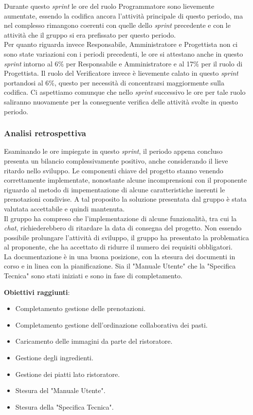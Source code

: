 Durante questo \textit{sprint} le ore del ruolo Programmatore sono lievemente aumentate, essendo la codifica ancora l'attività principale di questo periodo, ma nel complesso rimangono coerenti con quelle dello \textit{sprint} precedente e con le attività che il gruppo si era prefissato per questo periodo.\\
Per quanto riguarda invece Responsabile, Amministratore e Progettista non ci sono state variazioni con i periodi precedenti, le ore si attestano anche in questo \textit{sprint} intorno al 6\% per Responsabile e Amministratore e al 17\% per il ruolo di Progettista.
Il ruolo del Verificatore invece è lievemente calato in questo \textit{sprint} portandosi al 6\%, questo per necessità di concentrarsi maggiormente sulla codifica. Ci aspettiamo comunque che nello \textit{sprint} successivo le ore per tale ruolo saliranno nuovamente per la conseguente verifica delle attività svolte in questo periodo.


\subsubsection{Analisi retrospettiva}
Esaminando le ore impiegate in questo \textit{sprint}, il periodo appena concluso presenta un bilancio complessivamente positivo, anche considerando il lieve ritardo nello sviluppo.
Le componenti chiave del progetto stanno venendo correttamente implementate, nonostante alcune incomprensioni con il proponente riguardo al metodo di impementazione di alcune caratteristiche inerenti le prenotazioni condivise.
A tal proposito la soluzione presentata dal gruppo è stata valutata accettabile e quindi mantenuta.\\
Il gruppo ha compreso che l'implementazione di alcune funzionalità, tra cui la \textit{chat}, richiederebbero di ritardare la data di consegna del progetto.
Non essendo possibile prolungare l'attività di sviluppo, il gruppo ha presentato la problematica al proponente, che ha accettato di ridurre il numero dei requisiti obbligatori. \\
La documentazione è in una buona posizione, con la stesura dei documenti in corso e in linea con la pianificazione. Sia il "Manuale Utente" che la "Specifica Tecnica"
sono stati iniziati e sono in fase di completamento.

\textbf{Obiettivi raggiunti}:
\begin{itemize}
	\item Completamento gestione delle prenotazioni.
	\item Completamento gestione dell'ordinazione collaborativa dei pasti.
	\item Caricamento delle immagini da parte del ristoratore.
	\item Gestione degli ingredienti.
	\item Gestione dei piatti lato ristoratore.
	\item Stesura del "Manuale Utente".
	\item Stesura della "Specifica Tecnica".
\end{itemize}


